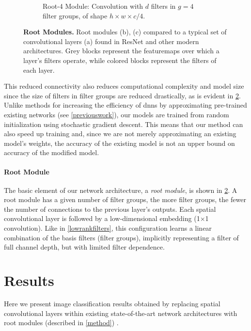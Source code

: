 \documentclass[thesis]{subfiles}
\begin{document}
\begin{figure}[tbp]
\begin{subfigure}[b]{0.95\textwidth}
			\caption{Root-4 Module: Convolution with $d$ filters in $g = 4$ filter groups, of shape $h\times w\times c/4$.}
			\label{fig:rootresnet4}
		\end{subfigure}
		\caption[Root modules: learning a channel basis for filters]{\textbf{Root Modules.} Root modules (b), (c) compared to a typical set of convolutional layers (a) found in ResNet and other modern architectures. Grey blocks represent the \glspl{featuremap} over which a layer's filters operate, while colored blocks represent the filters of each layer. 
		}
		\label{fig:rootmodule}
	\end{figure}
	This reduced connectivity also reduces computational complexity and model size since the size of filters in filter groups are reduced drastically, as is evident in \cref{fig:rootmodule}. Unlike methods for increasing the efficiency of \glspl{dnn} by approximating pre-trained existing networks (see \cref{previouswork}), our models are trained from random initialization using stochastic gradient descent. This means that our method can also speed up training and, since we are not merely approximating an existing model's weights, the accuracy of the existing model is not an upper bound on accuracy of the modified model.
	
	\paragraph{Root Module}
	The basic element of our network architecture, a \emph{root module}, is shown in \cref{fig:rootmodule}. A root module has a given number of filter groups, the more filter groups, the fewer the number of connections to the previous layer's outputs. Each spatial convolutional layer is followed by a low-dimensional embedding (1$\times$1 convolution). Like in \cref{lowrankfilters}, this configuration  learns a linear combination of the basis filters (filter groups), implicitly representing a filter of full channel depth, but with limited filter dependence.
	
	\section{Results}
	Here we present image classification results obtained by replacing spatial convolutional layers within existing state-of-the-art network architectures with root modules (described in \cref{method}) .
	
\end{document}
